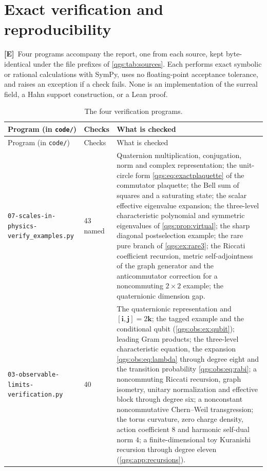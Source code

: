 \documentclass[11pt,oneside]{article}
\numberwithin{equation}{section}
\theoremstyle{plain}
\theoremstyle{definition}
\theoremstyle{remark}
\newcommand{\qi}{\mathbf i}
\newcommand{\qj}{\mathbf j}
\newcommand{\qk}{\mathbf k}
\newcommand{\TE}{\textcolor{TierE}{\textsf{\bfseries[E]}}}
\begin{document}
\appendix
\section{Exact verification and reproducibility}\label{qgs:app:verification}
\TE\ Four programs accompany the report, one from each source, kept byte-identical under the file prefixes of \cref{qgs:tab:sources}. Each performs exact symbolic or rational calculations with SymPy, uses no floating-point acceptance tolerance, and raises an exception if a check fails. None is an implementation of the surreal field, a Hahn support construction, or a Lean proof.

\begin{longtable}{@{}L{0.30\textwidth}L{0.12\textwidth}L{0.50\textwidth}@{}}
\caption{The four verification programs.}\label{qgs:tab:verification}\\
\toprule
Program (in \texttt{code/}) & Checks & What is checked\\
\midrule
\endfirsthead
\toprule
Program (in \texttt{code/}) & Checks & What is checked\\
\midrule
\endhead
\bottomrule
\endfoot
\nolinkurl{07-scales-in-physics-verify_examples.py} & 43 named & Quaternion multiplication, conjugation, norm and complex representation; the unit-circle form \eqref{qgs:eq:exactplaquette} of the commutator plaquette; the Bell sum of squares and a saturating state; the scalar effective eigenvalue expansion; the three-level characteristic polynomial and symmetric eigenvalues of \cref{qgs:prop:virtual}; the sharp diagonal postselection example; the rare pure branch of \cref{qgs:ex:rare3}; the Riccati coefficient recursion, metric self-adjointness of the graph generator and the anticommutator correction for a noncommuting $2\times2$ example; the quaternionic dimension gap.\\[3pt]
\nolinkurl{03-observable-limits-verification.py} & 40 & The quaternionic representation and $[\qi,\qj]=2\qk$; the tagged example and the conditional qubit (\cref{qgs:obs:ex:qubit}); leading Gram products; the three-level characteristic equation, the expansion \eqref{qgs:obs:eq:lambda} through degree eight and the transition probability \eqref{qgs:obs:eq:rabi}; a noncommuting Riccati recursion, graph isometry, unitary normalization and effective block through degree six; a nonconstant noncommutative Chern--Weil transgression; the torus curvature, zero charge density, action coefficient $8$ and harmonic self-dual norm $4$; a finite-dimensional toy Kuranishi recursion through degree eleven (\cref{qgs:app:recursions}).\\[3pt]

\end{longtable}
\end{document}
